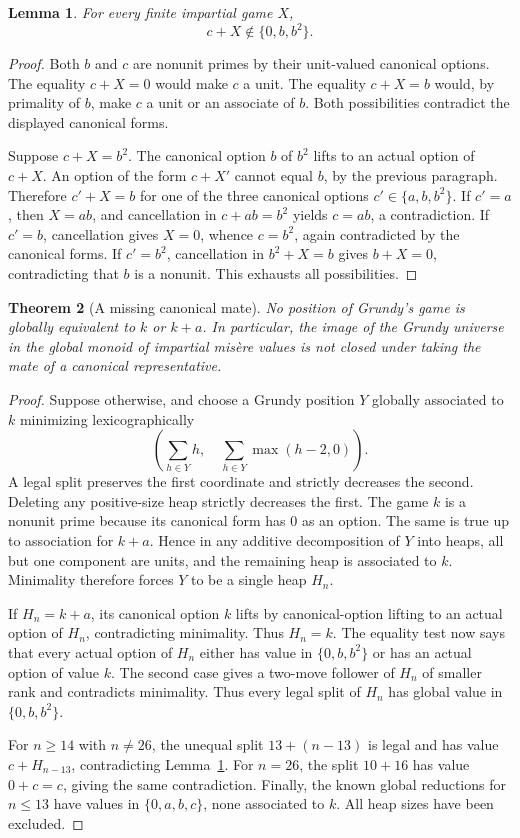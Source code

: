\documentclass[11pt]{article}
\newtheorem{theorem}{Theorem}[section]
\newtheorem{lemma}[theorem]{Lemma}
\theoremstyle{definition}
\theoremstyle{remark}
\begin{document}
\begin{lemma}\label{lem:grundy-c-not-part-small}
For every finite impartial game $X$,
\[
 c+X\notin\{0,b,b^2\}.
\]
\end{lemma}
\begin{proof}
Both $b$ and $c$ are nonunit primes by their unit-valued canonical options.
The equality $c+X=0$ would make $c$ a unit.  The equality $c+X=b$ would,
by primality of $b$, make $c$ a unit or an associate of $b$.  Both
possibilities contradict the displayed canonical forms.

Suppose $c+X=b^2$.  The canonical option $b$ of $b^2$ lifts to an actual
option of $c+X$.  An option of the form $c+X'$ cannot equal $b$, by the
previous paragraph.  Therefore $c'+X=b$ for one of the three canonical
options $c'\in\{a,b,b^2\}$.
If $c'=a$, then $X=ab$, and cancellation in
$c+ab=b^2$ yields $c=ab$, a contradiction.  If $c'=b$, cancellation gives
$X=0$, whence $c=b^2$, again contradicted by the canonical forms.
If $c'=b^2$, cancellation in $b^2+X=b$ gives $b+X=0$, contradicting
that $b$ is a nonunit.  This exhausts all possibilities.
\end{proof}

\begin{theorem}[A missing canonical mate]\label{thm:grundy-missing-mate}
No position of Grundy's game is globally equivalent to $k$ or $k+a$.
In particular, the image of the Grundy universe in the global monoid of
impartial mis\`ere values is not closed under taking the mate of a
canonical representative.
\end{theorem}
\begin{proof}
Suppose otherwise, and choose a Grundy position $Y$ globally associated to
$k$ minimizing lexicographically
\[
 \left(\sum_{h\in Y}h,\quad \sum_{h\in Y}\max(h-2,0)\right).
\]
A legal split preserves the first coordinate and strictly decreases the
second.  Deleting any positive-size heap strictly decreases the first.
The game $k$ is a nonunit prime because its canonical form has $0$ as an
option.  The same is true up to association for $k+a$.  Hence in any
additive decomposition of $Y$ into heaps, all but one component are units,
and the remaining heap is associated to $k$.  Minimality therefore forces
$Y$ to be a single heap $H_n$.

If $H_n=k+a$, its canonical option $k$ lifts by
canonical-option lifting to an actual option of $H_n$, contradicting
minimality.  Thus $H_n=k$.
The equality test now says that every actual option of $H_n$ either has
value in $\{0,b,b^2\}$ or has an actual option of value $k$.
The second case gives a two-move follower of $H_n$ of smaller rank and
contradicts minimality.  Thus every legal split of $H_n$ has global value
in $\{0,b,b^2\}$.

For $n\ge14$ with $n\ne26$, the unequal split
$13+(n-13)$ is legal and has value $c+H_{n-13}$, contradicting
Lemma~\ref{lem:grundy-c-not-part-small}.  For $n=26$, the split $10+16$
has value $0+c=c$, giving the same contradiction.  Finally, the known
global reductions for $n\le13$ have values in $\{0,a,b,c\}$, none
associated to $k$.  All heap sizes have been excluded.
\end{proof}
\end{document}
